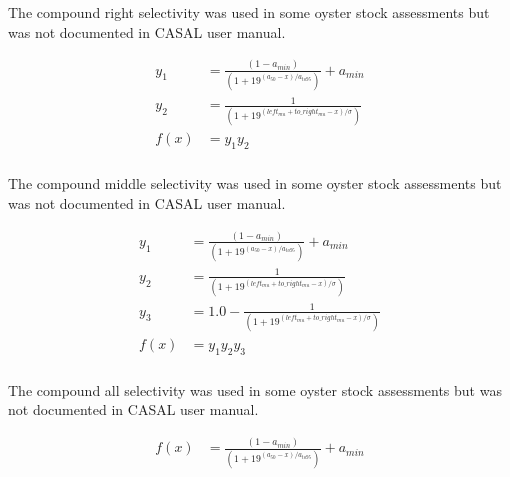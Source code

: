 The compound right selectivity was used in some oyster stock assessments but was not documented in CASAL user manual.

\begin{align*}
y_1 & = \frac{\left(1 - a_{min}\right)}{\left(1 + 19^{(a_{50} - x)/a_{to95}}\right)}  + a_{min}\\
y_2 & = \frac{1}{\left(1 + 19^{(left_{mu} + to\_right_{mu} - x)/\sigma}\right)}\\
f(x)  &= 	y_1 y_2
\end{align*}

\subsubsection[Compound-Middle]{}\label{sec:Selectivity-CompoundMidde}

The compound middle selectivity was used in some oyster stock assessments but was not documented in CASAL user manual.

\begin{align*}
y_1 & = \frac{\left(1 - a_{min}\right)}{\left(1 + 19^{(a_{50} - x)/a_{to95}}\right)}  + a_{min}\\
y_2 & = \frac{1}{\left(1 + 19^{(left_{mu} + to\_right_{mu} - x)/\sigma}\right)}\\
y_3 & = 1.0 -  \frac{1}{\left(1 + 19^{(left_{mu} + to\_right_{mu} - x)/\sigma}\right)}\\
f(x)  &= 	y_1 y_2 y_3
\end{align*}

\subsubsection[Compound-All]{}\label{sec:Selectivity-CompoundAll}

The compound all selectivity was used in some oyster stock assessments but was not documented in CASAL user manual.

\begin{align*}
	f(x)  & = \frac{\left(1 - a_{min}\right)}{\left(1 + 19^{(a_{50} - x)/a_{to95}}\right)}  + a_{min}
\end{align*}

\subsubsection[Multi Selectivity ]{} \label{sec:Selectivity-MultiSelectivities}

